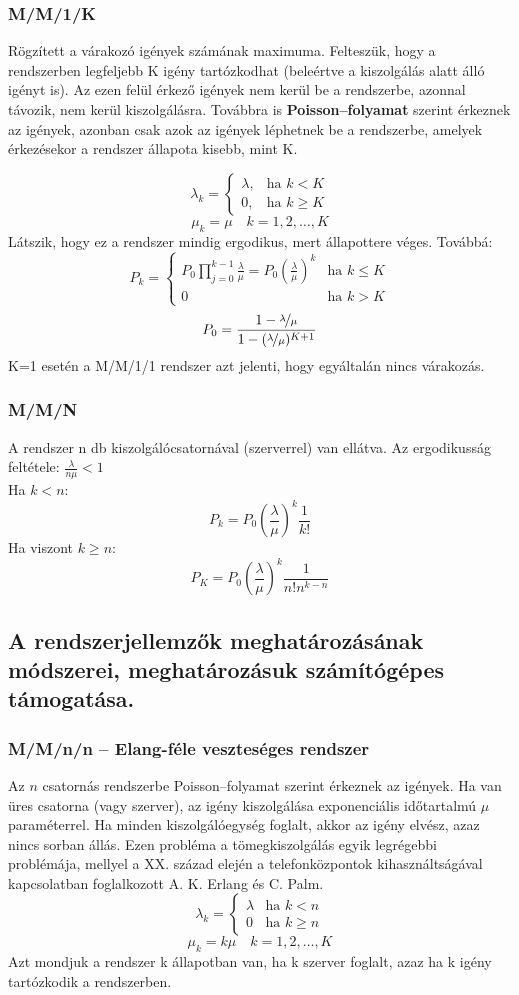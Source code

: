 \subsubsection{M/M/1/K}
Rögzített a várakozó igények számának maximuma. Felteszük, hogy a rendszerben legfeljebb K igény tartózkodhat (beleértve a kiszolgálás alatt álló igényt is). Az ezen felül érkező igények nem kerül be a rendszerbe, azonnal távozik, nem kerül kiszolgálásra. Továbbra is \textbf{Poisson--folyamat} szerint érkeznek az igények, azonban csak azok az igények léphetnek be a rendszerbe, amelyek érkezésekor a rendszer állapota kisebb, mint K.

$$\lambda_k=
\begin{cases}
\lambda, & \text{ha } k<K\\
0, & \text{ha } k\geq K 
\end{cases}$$
$$ \mu_k=\mu \quad k=1,2,\dots,K$$
Látszik, hogy ez a rendszer mindig ergodikus, mert állapottere véges. Továbbá:
$$P_k = 
\begin{cases}
P_0\prod_{j=0}^{k-1}\frac{\lambda}{\mu}=P_0(\frac{\lambda}{\mu})^k & \text{ha }k\leq K\\
0 & \text{ha }k>K
\end{cases}$$
$$P_0 = \frac{1-\nicefrac{\lambda}{\mu}}{1-(\nicefrac{\lambda}{\mu})^{K+1}}$$
K=1 esetén a M/M/1/1 rendszer azt jelenti, hogy egyáltalán nincs várakozás.

\subsubsection{M/M/N}
A rendszer n db kiszolgálócsatornával (szerverrel) van ellátva.
Az ergodikusság feltétele: $\frac{\lambda}{n\mu}<1$\\
Ha $k<n$:
$$P_k=P_0(\frac{\lambda}{\mu})^k\frac{1}{k!}$$
Ha viszont $k\geq n$:
$$P_K=P_0(\frac{\lambda}{\mu})^k\frac{1}{n!n^{k-n}}$$

\subsection{A rendszerjellemzők meghatározásának módszerei, meghatározásuk számítógépes támogatása.}

\subsubsection{M/M/n/n -- Elang-féle veszteséges rendszer}
Az $n$ csatornás rendszerbe Poisson--folyamat szerint érkeznek az igények. Ha van üres csatorna (vagy szerver), az igény kiszolgálása exponenciális időtartalmú $\mu$ paraméterrel. Ha minden kiszolgálóegység foglalt, akkor az igény elvész, azaz nincs sorban állás. Ezen probléma a tömegkiszolgálás egyik legrégebbi problémája, mellyel a XX. század elején a telefonközpontok kihasználtságával kapcsolatban foglalkozott A. K. Erlang és C. Palm.
$$\lambda_k=
\begin{cases}
\lambda & \text{ha } k<n\\
0 & \text{ha } k\geq n
\end{cases}$$
$$\mu_k=k\mu\quad k=1,2,\dots,K$$
Azt mondjuk a rendszer k állapotban van, ha k szerver foglalt, azaz ha k igény tartózkodik a rendszerben.

